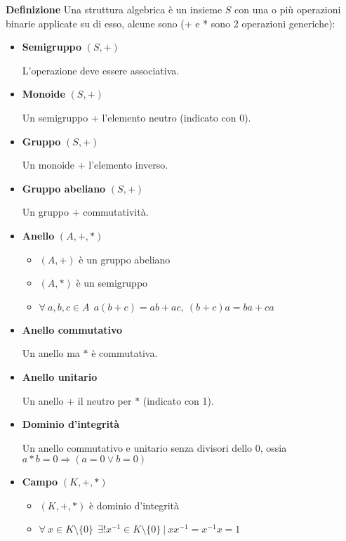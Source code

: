 \documentclass{article}
\begin{document}
\noindent\textbf{Definizione} Una struttura algebrica è un insieme $S$ con una o più operazioni binarie applicate su di esso, alcune sono (+ e * sono 2 operazioni generiche):
\begin{itemize}
    \item \textbf{Semigruppo} $(S,+)$

        L'operazione deve essere associativa.

    \item \textbf{Monoide} $(S,+)$

        Un semigruppo + l'elemento neutro (indicato con 0).

    \item \textbf{Gruppo} $(S,+)$

        Un monoide + l'elemento inverso.

    \item \textbf{Gruppo abeliano} $(S,+)$

        Un gruppo + commutatività.

    \item \textbf{Anello} $(A,+,*)$
        \begin{itemize}
            \item $(A,+)$ è un gruppo abeliano
            \item $(A,*)$ è un semigruppo
            \item $\forall\ a,b,c\in A\ \ a(b+c)=ab+ac,\ (b+c)a=ba+ca$
        \end{itemize}

    \item \textbf{Anello commutativo}

        Un anello ma $*$ è commutativa.

    \item \textbf{Anello unitario}

        Un anello + il neutro per $*$ (indicato con 1).

    \item \textbf{Dominio d'integrità}

        Un anello commutativo e unitario senza divisori dello 0, ossia $a*b=0\Rightarrow(a=0\vee b=0)$

    \item \textbf{Campo} $(K,+,*)$
        \begin{itemize}
            \item $(K,+,*)$ è dominio d'integrità
            \item $\forall\ x\in K\setminus\{0\}\ \ \exists!x^{-1}\in K\setminus\{0\}\ |\ xx^{-1}=x^{-1}x=1$\newline
        \end{itemize}
\end{itemize}
\end{document}
